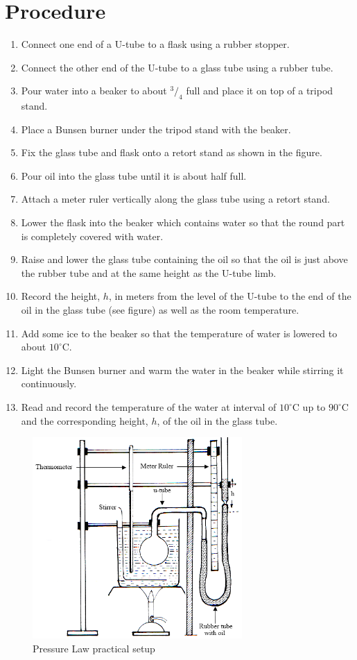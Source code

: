 \section{Procedure}
\begin{enumerate}
\item Connect one end of a U-tube to a flask using a rubber stopper.
\item Connect the other end of the U-tube to a glass tube using a rubber tube.
\item Pour water into a beaker to about $^3/_4$ full and place it on top of a tripod stand.
\item Place a Bunsen burner under the tripod stand with the beaker.
\item Fix the glass tube and flask onto a retort stand as shown in the figure.
\item Pour oil into the glass tube until it is about half full.
\item Attach a meter ruler vertically along the glass tube using a retort stand.
\item Lower the flask into the beaker which contains water so that the round part is completely covered with water.
\item Raise and lower the glass tube containing the oil so that the oil is just above the rubber tube and at the same height as the U-tube limb.
\item Record the height, $h$, in meters from the level of the U-tube to the end of the oil in the glass tube (see figure) as well as the room temperature.
\item Add some ice to the beaker so that the temperature of water is lowered to about $10^\circ$C.
\item Light the Bunsen burner and warm the water in the beaker while stirring it continuously.
\item Read and record the temperature of the water at interval of $10^\circ$C up to $90^\circ$C and the corresponding height, $h$, of the oil in the glass tube.
\end{enumerate}

\begin{figure}[h!]
\centering
\includegraphics[width=8cm]{./img/pressure-law-1.png}
\caption{Pressure Law practical setup}
\label{fig:pressure-law-1}
\end{figure}

